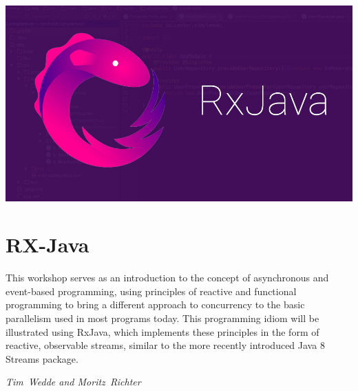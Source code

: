 \hfill\includegraphics[width=.65\linewidth]{images/rxjava-series-cover.jpg}

\section*{RX-Java}
  This workshop serves as an introduction to the concept of asynchronous and event-based programming, using principles of reactive and functional programming to bring a different approach to concurrency to the basic parallelism used in most programs today. This programming idiom will be illustrated using RxJava, which implements these principles in the form of reactive, observable streams, similar to the more recently introduced Java 8 Streams package.

\hfill\textit{Tim~Wedde and Moritz~Richter}